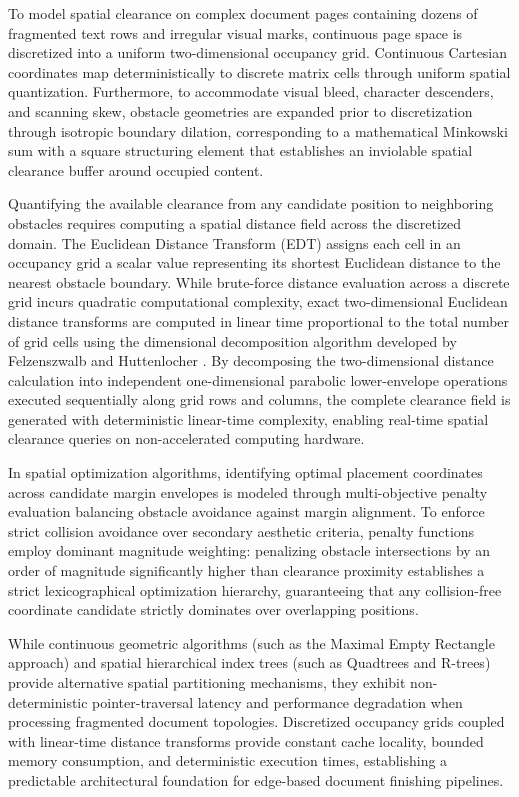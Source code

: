 To model spatial clearance on complex document pages containing dozens of fragmented text rows and irregular visual marks, continuous page space is discretized into a uniform two-dimensional occupancy grid.
Continuous Cartesian coordinates map deterministically to discrete matrix cells through uniform spatial quantization.
Furthermore, to accommodate visual bleed, character descenders, and scanning skew, obstacle geometries are expanded prior to discretization through isotropic boundary dilation, corresponding to a mathematical Minkowski sum with a square structuring element that establishes an inviolable spatial clearance buffer around occupied content.

Quantifying the available clearance from any candidate position to neighboring obstacles requires computing a spatial distance field across the discretized domain.
The Euclidean Distance Transform (EDT) assigns each cell in an occupancy grid a scalar value representing its shortest Euclidean distance to the nearest obstacle boundary.
While brute-force distance evaluation across a discrete grid incurs quadratic computational complexity, exact two-dimensional Euclidean distance transforms are computed in linear time proportional to the total number of grid cells using the dimensional decomposition algorithm developed by Felzenszwalb and Huttenlocher \cite{ref57}.
By decomposing the two-dimensional distance calculation into independent one-dimensional parabolic lower-envelope operations executed sequentially along grid rows and columns, the complete clearance field is generated with deterministic linear-time complexity, enabling real-time spatial clearance queries on non-accelerated computing hardware.

In spatial optimization algorithms, identifying optimal placement coordinates across candidate margin envelopes is modeled through multi-objective penalty evaluation balancing obstacle avoidance against margin alignment.
To enforce strict collision avoidance over secondary aesthetic criteria, penalty functions employ dominant magnitude weighting: penalizing obstacle intersections by an order of magnitude significantly higher than clearance proximity establishes a strict lexicographical optimization hierarchy, guaranteeing that any collision-free coordinate candidate strictly dominates over overlapping positions.

While continuous geometric algorithms (such as the Maximal Empty Rectangle approach) and spatial hierarchical index trees (such as Quadtrees and R-trees) provide alternative spatial partitioning mechanisms, they exhibit non-deterministic pointer-traversal latency and performance degradation when processing fragmented document topologies.
Discretized occupancy grids coupled with linear-time distance transforms provide constant cache locality, bounded memory consumption, and deterministic execution times, establishing a predictable architectural foundation for edge-based document finishing pipelines.

